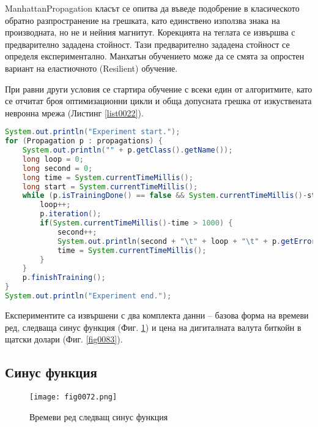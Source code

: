 ManhattanPropagation класът се опитва да въведе подобрение в класическото обратно разпространение на грешката, като единствено използва знака на производната, но не и нейния магнитут. Корекцията на теглата се извършва с предварително зададена стойност. Тази предварително зададена стойност се определя експериментално. Манхатън обучението може да се смята за опростен вариант на еластиочното (Resilient) обучение.

При равни други условия се стартира обучение с всеки един от алгоритмите, като се отчитат броя оптимизационни цикли и обща допусната грешка от изкуствената невронна мрежа (Листинг \ref{list0022}).\pagebreak

\begin{lstlisting}[caption=Експериментална проверка на точните числени алгоритми, language=Java, basicstyle=\tiny, label=list0022]
System.out.println("Experiment start.");
for (Propagation p : propagations) {
    System.out.println("" + p.getClass().getName());
    long loop = 0;
    long second = 0;
    long time = System.currentTimeMillis();
    long start = System.currentTimeMillis();
    while (p.isTrainingDone() == false && System.currentTimeMillis()-start < 1*60*1000) {
        loop++;
        p.iteration();
        if(System.currentTimeMillis()-time > 1000) {
            second++;
            System.out.println(second + "\t" + loop + "\t" + p.getError());
            time = System.currentTimeMillis();
        }
    }
    p.finishTraining();
}
System.out.println("Experiment end.");
\end{lstlisting}

Експериментите са извършени с два комплекта данни – базова форма на времеви ред, следваща синус функция (Фиг. \ref{fig0072}) и цена на дигиталната валута биткойн в щатски долари (Фиг. \ref{fig0083}). 

\subsection{Синус функция}

\begin{figure}[H]
  \centering
  \texttt{[image: fig0072.png]}
  \caption{Времеви ред следващ синус функция}
\label{fig0072}
\end{figure}

